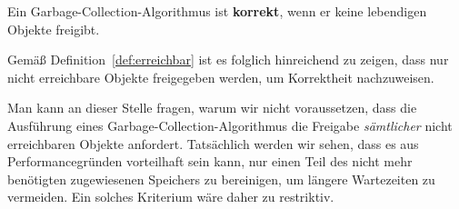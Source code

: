 \begin{mybox}
\begin{defn}
	Ein Garbage-Collection-Algorithmus ist \textbf{korrekt}, wenn er keine lebendigen Objekte freigibt.
\end{defn}
\end{mybox}

Gemäß Definition~\ref{def:erreichbar} ist es folglich hinreichend zu zeigen, dass nur nicht erreichbare Objekte freigegeben werden, um Korrektheit nachzuweisen.

Man kann an dieser Stelle fragen, warum wir nicht voraussetzen, dass die Ausführung eines Garbage-Collection-Algorithmus die Freigabe \textit{sämtlicher} nicht erreichbaren Objekte anfordert.
Tatsächlich werden wir sehen, dass es aus Performancegründen vorteilhaft sein kann, nur einen Teil des nicht mehr benötigten zugewiesenen Speichers zu bereinigen, um längere Wartezeiten zu vermeiden.
Ein solches Kriterium wäre daher zu restriktiv.